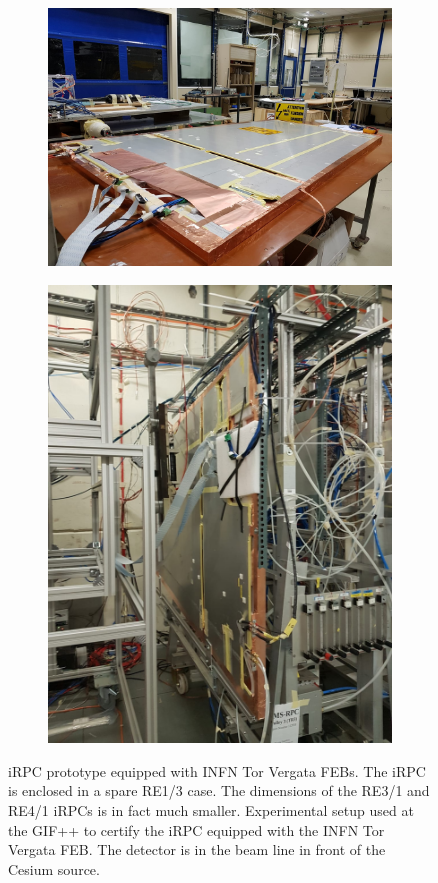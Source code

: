 	\begin{figure}[H]
		\begin{subfigure}{.5\linewidth}
			\centering
			\includegraphics[width = 0.9\linewidth]{fig/chapt6/INFN-FEB-iRPC.png}
			\caption{\label{fig:INFN-iRPC:A}}
		\end{subfigure}
		\begin{subfigure}{.5\linewidth}
			\centering
			\includegraphics[width = 0.9\linewidth]{fig/chapt6/INFN-FEB-iRPC-GIFpp.png}
			\caption{\label{fig:INFN-iRPC:B}}
		\end{subfigure}
		\caption{\label{fig:INFN-iRPC}  iRPC prototype equipped with INFN Tor Vergata FEBs. The iRPC is enclosed in a spare RE1/3 case. The dimensions of the RE3/1 and RE4/1 iRPCs is in fact much smaller.  Experimental setup used at the GIF++ to certify the iRPC equipped with the INFN Tor Vergata FEB. The detector is in the beam line in front of the Cesium source.}
    \end{figure}
    
